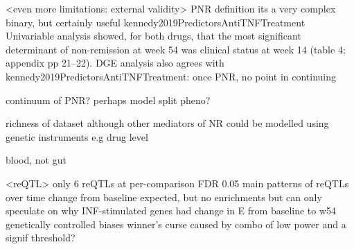 \begin{outline}
\1 <even more limitations: external validity>
    \2 PNR definition
        \3 its a very complex binary, but certainly useful
        \3 kennedy2019PredictorsAntiTNFTreatment Univariable analysis showed, for both drugs, that the most significant determinant of non-remission at week 54 was clinical status at week 14 (table 4; appendix pp 21–22).
        \3 DGE analysis also agrees with kennedy2019PredictorsAntiTNFTreatment: once PNR, no point in continuing

        \3 continuum of PNR? perhaps model split pheno?

        richness of dataset 
        although
        other mediators of NR could be modelled using genetic instruments e.g drug level

    \2 blood, not gut

\1 <reQTL>
    \2 only 6 reQTLs at per-comparison FDR 0.05
     main patterns of reQTLs over time
    \2 change from baseline expected, but no enrichments
    \2 but can only speculate on why INF-stimulated genes had change in E from baseline to w54 genetically controlled
    \2 biases
        \3 winner's curse caused by combo of low power and a signif threshold?


\end{outline}
